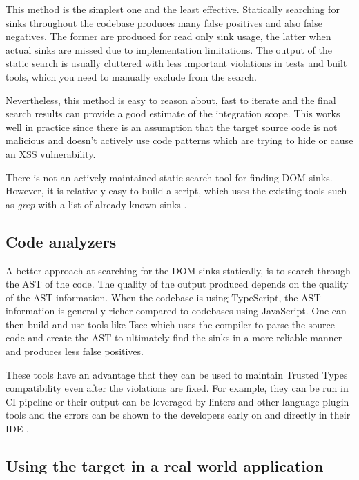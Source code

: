 This method is the simplest one and the least effective. Statically searching for sinks throughout
the codebase produces many false positives and also false negatives. The former are produced for
read only sink usage, the latter when actual sinks are missed due to implementation limitations. The
output of the static search is usually cluttered with less important violations in tests and built
tools, which you need to manually exclude from the search.

Nevertheless, this method is easy to reason about, fast to iterate and the final search results can
provide a good estimate of the integration scope. This works well in practice since there is an
assumption that the target source code is not malicious and doesn't actively use code patterns which
are trying to hide or cause an XSS vulnerability.

There is not an actively maintained static search tool for finding DOM sinks. However, it is
relatively easy to build a script, which uses the existing tools such as \textit{grep} with a list
of already known sinks \cite{xss_sink_finder}.

\subsection{Code analyzers}

A better approach at searching for the DOM sinks statically, is to search through the AST of the
code. The quality of the output produced depends on the quality of the AST information. When the
codebase is using TypeScript, the AST information is generally richer compared to codebases using
JavaScript. One can then build and use tools like Tsec \cite{tsec_github} which uses the compiler to
parse the source code and create the AST to ultimately find the sinks in a more reliable manner and
produces less false positives.

These tools have an advantage that they can be used to maintain Trusted Types compatibility even
after the violations are fixed. For example, they can be run in CI pipeline or their output can be
leveraged by linters and other language plugin tools and the errors can be shown to the developers
early on and directly in their IDE \cite{tsec_lsp}.

\subsection{Using the target in a real world application}

